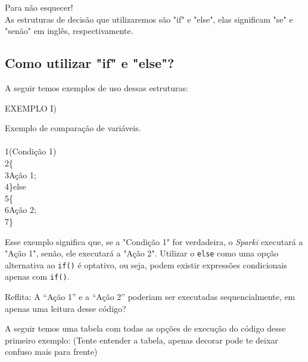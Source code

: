 \documentclass[conference]{IEEEtran}
\begin{document}
\begin{center}
            {\color{azulbebe}Para não esquecer!}\\
            As estruturas de decisão que utilizaremos são "if" e "else", elas significam "se" e "senão" em inglês, respectivamente.
\end{center}

\begin{center}
\subsection{Como utilizar "if" e "else"?}
\end{center}

\par
A seguir temos exemplos de uso dessas estruturas:\\

\begin{center}
EXEMPLO I)
\end{center}
\par
Exemplo de comparação de variáveis.
\\
\\
{\selectfont 
{\color{cinza}1}(Condição 1)\\
{\color{cinza}2}\quad\{\\
{\color{cinza}3}\quad\quad Ação 1;\\
{\color{cinza}4}\quad\}{\color{verde}else}\\
{\color{cinza}5}\quad\{\\
{\color{cinza}6}\quad\quad Ação 2;\\
{\color{cinza}7}\quad\}}

\par
Esse exemplo significa que, se a "Condição 1" for verdadeira, o \textit{Sparki} executará a "Ação 1", senão, ele executará a "Ação 2". Utilizar o \texttt{else} como uma opção alternativa ao \texttt{if()} é optativo, ou seja, podem existir expressões condicionais apenas com \texttt{if()}.
\par
Reflita: A “Ação 1” e a “Ação 2” poderiam ser executadas sequencialmente, em apenas uma leitura desse código?
\par
A seguir temos uma tabela com todas as opções de execução do código desse primeiro exemplo: (Tente entender a tabela, apenas decorar pode te deixar confuso mais para frente)
\end{document}
